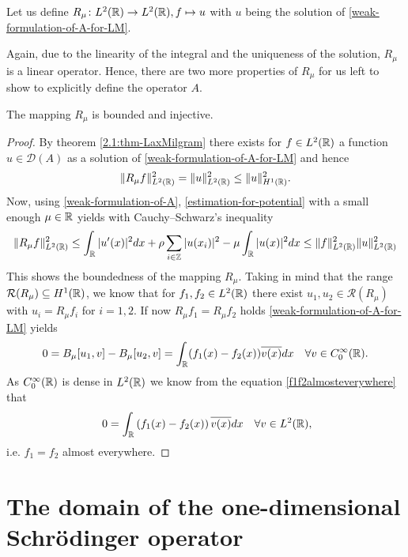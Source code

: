 \begin{definition}
	Let us define $R_{\mu} \colon L^{2}(\mathbb{R}) \rightarrow L^{2}(\mathbb{R}), f \mapsto u$ with $u$ being the solution of \eqref{weak-formulation-of-A-for-LM}.
\end{definition}
Again, due to the linearity of the integral and the uniqueness of the solution, $R_{\mu}$ is a linear operator. Hence, there are two more properties of $R_{\mu}$ for us left to show to explicitly define the operator $A$. 
\begin{theorem} \label{rmuinj}
	The mapping $R_{\mu}$ is bounded and injective.
	
	\begin{proof}
		By theorem \ref{2.1:thm-LaxMilgram} there exists for $f \in L^{2}(\mathbb{R})$ a function $u \in \mathcal{D}(A)$ as a solution of \eqref{weak-formulation-of-A-for-LM} and hence
		\[ \| R_{\mu} f \|_{L^{2}(\mathbb{R})}^{2} = \| u \|_{L^{2}(\mathbb{R})}^{2} \leq \| u \|_{H^{1}(\mathbb{R})}^{2}. \] 
		Now, using \eqref{weak-formulation-of-A}, \eqref{estimation-for-potential} with a small enough $\mu \in \mathbb{R}$ yields with Cauchy–Schwarz's inequality
		\[ \| R_{\mu} f \|_{L^{2}(\mathbb{R})}^{2} \leq \int_{\mathbb{R}} |u'(x)|^{2} dx + \rho \sum_{i \in \mathbb{Z}} |u(x_{i})|^{2} - \mu \int_{\mathbb{R}} |u(x)|^{2} dx \leq \| f \|_{L^{2}(\mathbb{R})}^{2} \| u \|_{L^{2}(\mathbb{R})}^{2} \]	
		This shows the boundedness of the mapping $R_{\mu}$. Taking in mind that the range $\mathcal{R}(R_{\mu}) \subseteq H^{1}(\mathbb{R})$, we know that for $f_{1}, f_{2} \in L^{2}(\mathbb{R})$ there exist  $u_{1}, u_{2} \in \mathcal{R}(R_{\mu})$ with $u_{i} = R_{\mu} f_{i}$ for $i = 1, 2$. If now $R_{\mu} f_{1} = R_{\mu} f_{2}$ holds \eqref{weak-formulation-of-A-for-LM} yields
		\begin{equation}
			0 = B_{\mu}[u_{1}, v] - B_{\mu}[u_{2}, v] = \int_{\mathbb{R}} (f_{1}(x) - f_{2}(x)) \overline{v(x)} dx \quad \forall v \in C_{0}^{\infty}(\mathbb{R}). \label{f1f2almosteverywhere}
		\end{equation} 
		As $C_{0}^{\infty}(\mathbb{R})$ is dense in $L^{2}(\mathbb{R})$ we know from the equation \eqref{f1f2almosteverywhere} that
		\[ 0 = \int_{\R} \left(f_{1}(x) - f_{2}(x)\right) \overline{v(x)} dx \quad \forall v \in L^{2}(\R), \]
		i.e. $f_{1} = f_{2}$ almost everywhere.
	\end{proof}
\end{theorem}

\section{The domain of the one-dimensional Schrödinger operator} \label{sec:3.2}

